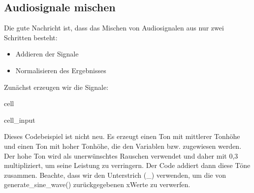 \documentclass[letterpaper,10pt,english]{jupyterBook}
\begin{document}
\subsection{Audiosignale mischen}
\label{\detokenize{content/T_Spektralanalyse_Audio:audiosignale-mischen}}
\sphinxAtStartPar
Die gute Nachricht ist, dass das Mischen von Audiosignalen aus nur zwei Schritten besteht:
\begin{itemize}
\item {} 
\sphinxAtStartPar
Addieren der Signale

\item {} 
\sphinxAtStartPar
Normalisieren des Ergebnisses

\end{itemize}

\sphinxAtStartPar
Zunächst erzeugen wir die Signale:

\begin{sphinxuseclass}{cell}\begin{sphinxVerbatimInput}

\begin{sphinxuseclass}{cell_input}
\begin{sphinxVerbatim}[commandchars=\\\{\}]
     
     
    

    
\end{sphinxVerbatim}

\end{sphinxuseclass}\end{sphinxVerbatimInput}

\end{sphinxuseclass}
\sphinxAtStartPar
Dieses Codebeispiel ist nicht neu. Es erzeugt einen Ton mit mittlerer Tonhöhe und einen Ton mit hoher Tonhöhe, die den Variablen  bzw.  zugewiesen werden. Der hohe Ton wird als unerwünschtes Rauschen verwendet und daher mit 0,3 multipliziert, um seine Leistung zu verringern. Der Code addiert dann diese Töne zusammen. Beachte, dass wir den Unterstrich (\_) verwenden, um die von generate\_sine\_wave() zurückgegebenen x\sphinxhyphen{}Werte zu verwerfen.
\end{document}
